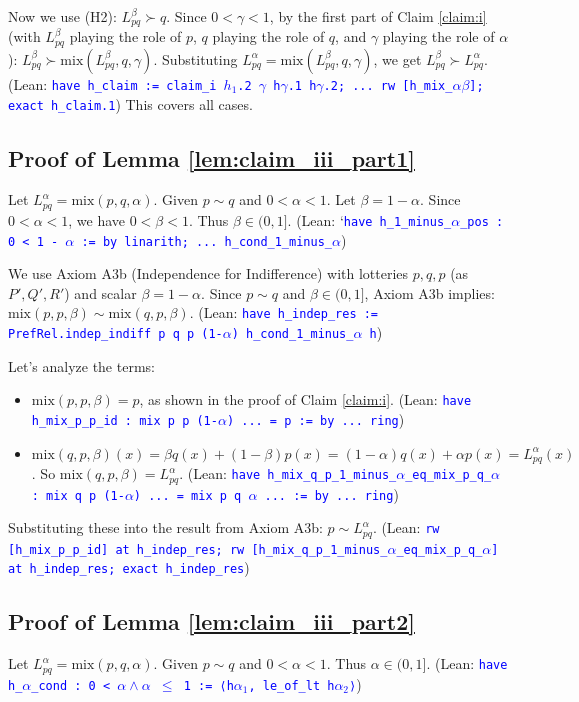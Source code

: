 \documentclass{article}
\theoremstyle{definition}
\newcommand{\tactic}[1]{\textcolor{blue}{\texttt{#1}}}
\newcommand{\strictpref}{\succ} %
\newcommand{\indiff}{\sim} %
\newcommand{\mix}{\mathrm{mix}} %
\begin{document}
    Now we use (H2): $L_{pq}^\beta \strictpref q$. Since $0 < \gamma < 1$, by the first part of Claim \ref{claim:i} (with $L_{pq}^\beta$ playing the role of $p$, $q$ playing the role of $q$, and $\gamma$ playing the role of $\alpha$):
    $L_{pq}^\beta \strictpref \mix(L_{pq}^\beta, q, \gamma)$.
    Substituting $L_{pq}^\alpha = \mix(L_{pq}^\beta, q, \gamma)$, we get $L_{pq}^\beta \strictpref L_{pq}^\alpha$.
    (Lean: \tactic{have h\_claim := claim\_i $h_1$.2 $\gamma$ h$\gamma$.1 h$\gamma$.2; ... rw [h\_mix\_$\alpha\beta$]; exact h\_claim.1})
This covers all cases.

\subsection{Proof of Lemma \ref{lem:claim_iii_part1}}\label{proof:lem:claim_iii_part1}
Let $L_{pq}^\alpha = \mix(p, q, \alpha)$.
Given $p \indiff q$ and $0 < \alpha < 1$.
Let $\beta = 1-\alpha$. Since $0 < \alpha < 1$, we have $0 < \beta < 1$. Thus $\beta \in (0,1]$.
(Lean: `\tactic{have h\_1\_minus\_$\alpha$\_pos : 0 < 1 - $\alpha$ := by linarith; ... h\_cond\_1\_minus\_$\alpha$})

We use Axiom A3b (Independence for Indifference) with lotteries $p, q, p$ (as $P', Q', R'$) and scalar $\beta = 1-\alpha$.
Since $p \indiff q$ and $\beta \in (0,1]$, Axiom A3b implies:
$\mix(p, p, \beta) \indiff \mix(q, p, \beta)$.
(Lean: \tactic{have h\_indep\_res := PrefRel.indep\_indiff p q p (1-$\alpha$) h\_cond\_1\_minus\_$\alpha$ h})

Let's analyze the terms:
\begin{itemize}
    \item $\mix(p, p, \beta) = p$, as shown in the proof of Claim \ref{claim:i}.
    (Lean: \tactic{have h\_mix\_p\_p\_id : mix p p (1-$\alpha$) ... = p := by ... ring})
    \item $\mix(q, p, \beta)(x) = \beta q(x) + (1-\beta)p(x) = (1-\alpha)q(x) + \alpha p(x) = L_{pq}^\alpha(x)$. So $\mix(q, p, \beta) = L_{pq}^\alpha$.
    (Lean: \tactic{have h\_mix\_q\_p\_1\_minus\_$\alpha$\_eq\_mix\_p\_q\_$\alpha$ : mix q p (1-$\alpha$) ... = mix p q $\alpha$ ... := by ... ring})
\end{itemize}
Substituting these into the result from Axiom A3b:
$p \indiff L_{pq}^\alpha$.
(Lean: \tactic{rw [h\_mix\_p\_p\_id] at h\_indep\_res; rw [h\_mix\_q\_p\_1\_minus\_$\alpha$\_eq\_mix\_p\_q\_$\alpha$] at h\_indep\_res; exact h\_indep\_res})

\subsection{Proof of Lemma \ref{lem:claim_iii_part2}}\label{proof:lem:claim_iii_part2}
Let $L_{pq}^\alpha = \mix(p, q, \alpha)$.
Given $p \indiff q$ and $0 < \alpha < 1$. Thus $\alpha \in (0,1]$.
(Lean: \tactic{have h\_$\alpha$\_cond : 0 < $\alpha\wedge\alpha$ $\leq$ 1 := ⟨h$\alpha_1$, le\_of\_lt h$\alpha_2$⟩})
\end{document}
